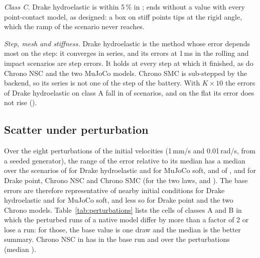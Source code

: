 \emph{Class C.} Drake hydroelastic is within 5\,\% in ;  ends
without a value with every point-contact model, as designed: a box on stiff points tips at the
rigid angle, which the ramp of the scenario never reaches.

\emph{Step, mesh and stiffness.} Drake hydroelastic is the method whose error depends most on
the step: it converges in  series, and its errors at 1\,ms in
the rolling and impact scenarios are step errors. It holds  at every step at
which it finished, as do Chrono NSC and the two MuJoCo models. Chrono SMC is sub-stepped by the
backend, so its series is not one of the step of the battery. With $K\times10$ the errors of
Drake hydroelastic on class A fall in  of 
scenarios, and on the flat  its error does not rise ().

\subsection{Scatter under perturbation}\label{sup:scatter}

Over the eight perturbations of the initial velocities (1\,mm/s and 0.01\,rad/s, from a seeded
generator), the range of the error relative to its median has a median over the scenarios of
 for Drake hydroelastic and  for MuJoCo soft, and of
,  and  for Drake point, Chrono NSC and
Chrono SMC (for the two laws,  and ). The base
errors are therefore representative of nearby initial conditions for Drake hydroelastic and for
MuJoCo soft, and less so for Drake point and the two Chrono models.
Table~\ref{tab:perturbations} lists the cells of classes A and B in which the perturbed runs of
a native model differ by more than a factor of 2 or lose a run: for those, the base value is
one draw and the median is the better summary. Chrono NSC in  has
 in the base run and  over the
perturbations (median ).

\begin{table}[!htbp]
\caption{Native models whose error scatters over the eight perturbed starts (classes A and B):
error [\%] of the base run, median and range of the perturbed runs that have a value, and number
of perturbed runs without one}
\label{tab:perturbations}
\end{table}

